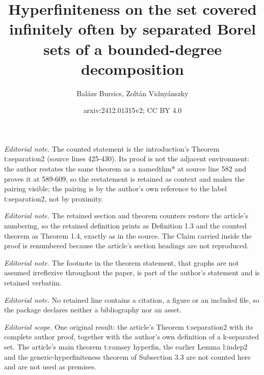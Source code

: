 \documentclass[11pt]{amsart}
\title{Hyperfiniteness on the set covered infinitely often by separated Borel sets of a bounded-degree decomposition}
\author{Balázs Bursics, Zoltán Vidnyánszky}
\date{arxiv:2412.01315v2; CC BY 4.0}
\theoremstyle{definition}
\numberwithin{equation}{section}
\begin{document}
\maketitle
\setcounter{section}{1}
\setcounter{theorem}{2}
\noindent\textit{Editorial note.} The counted statement is the introduction's Theorem t:separation2 (source lines 425-430). Its proof is not the adjacent environment: the author restates the same theorem as a namedthm* at source line 582 and proves it at 589-609, so the restatement is retained as context and makes the pairing visible; the pairing is by the author's own reference to the label t:separation2, not by proximity.\par\medskip
\noindent\textit{Editorial note.} The retained section and theorem counters restore the article's numbering, so the retained definition prints as Definition 1.3 and the counted theorem as Theorem 1.4, exactly as in the source. The Claim carried inside the proof is renumbered because the article's section headings are not reproduced.\par\medskip
\noindent\textit{Editorial note.} The footnote in the theorem statement, that graphs are not assumed irreflexive throughout the paper, is part of the author's statement and is retained verbatim.\par\medskip
\noindent\textit{Editorial note.} No retained line contains a citation, a figure or an included file, so the package declares neither a bibliography nor an asset.\par\medskip
\noindent\textit{Editorial scope.} One original result: the article's Theorem t:separation2 with its complete author proof, together with the author's own definition of a k-separated set. The article's main theorem t:ramsey hyperfin, the earlier Lemma l:indep2 and the generic-hyperfiniteness theorem of Subsection 3.3 are not counted here and are not used as premises.\par\medskip
\end{document}
